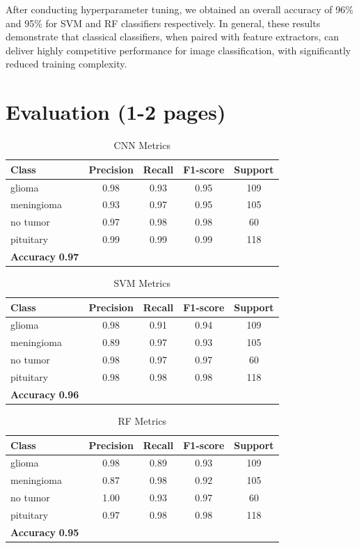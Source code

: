 \documentclass[conference]{IEEEtran}
\begin{document}
After conducting hyperparameter tuning, we obtained an overall accuracy of 96\% and 95\% for SVM and RF classifiers respectively. In general, these results demonstrate that classical classifiers, when paired with feature extractors, can deliver highly competitive performance for image classification, with significantly reduced training complexity.

\section{\large Evaluation (1-2 pages)}

\begin{table}[h!]
\centering
\caption{CNN Metrics}
\begin{tabular}{lcccc}
\toprule
\textbf{Class} & \textbf{Precision} & \textbf{Recall} & \textbf{F1-score} & \textbf{Support} \\
\midrule
glioma     & 0.98 & 0.93 & 0.95 & 109 \\
meningioma & 0.93 & 0.97 & 0.95 & 105 \\
no tumor   & 0.97 & 0.98 & 0.98 & 60 \\
pituitary  & 0.99 & 0.99 & 0.99 & 118 \\
\midrule
\textbf{Accuracy} \textbf{0.97} \\
\bottomrule
\end{tabular}
\end{table}

\begin{table}[h!]
\centering
\caption{SVM Metrics}
\begin{tabular}{lcccc}
\toprule
\textbf{Class} & \textbf{Precision} & \textbf{Recall} & \textbf{F1-score} & \textbf{Support} \\
\midrule
glioma     & 0.98 & 0.91 & 0.94 & 109 \\
meningioma & 0.89 & 0.97 & 0.93 & 105 \\
no tumor   & 0.98 & 0.97 & 0.97 & 60 \\
pituitary  & 0.98 & 0.98 & 0.98 & 118 \\
\midrule
\textbf{Accuracy} \textbf{0.96} \\
\bottomrule
\end{tabular}
\end{table}

\begin{table}
\centering
\caption{RF Metrics}
\begin{tabular}{lcccc}
\toprule
\textbf{Class} & \textbf{Precision} & \textbf{Recall} & \textbf{F1-score} & \textbf{Support} \\
\midrule
glioma     & 0.98 & 0.89 & 0.93 & 109 \\
meningioma & 0.87 & 0.98 & 0.92 & 105 \\
no tumor   & 1.00 & 0.93 & 0.97 & 60 \\
pituitary  & 0.97 & 0.98 & 0.98 & 118 \\
\midrule
\textbf{Accuracy} \textbf{0.95} \\
\bottomrule
\end{tabular}
\end{table}
\end{document}

